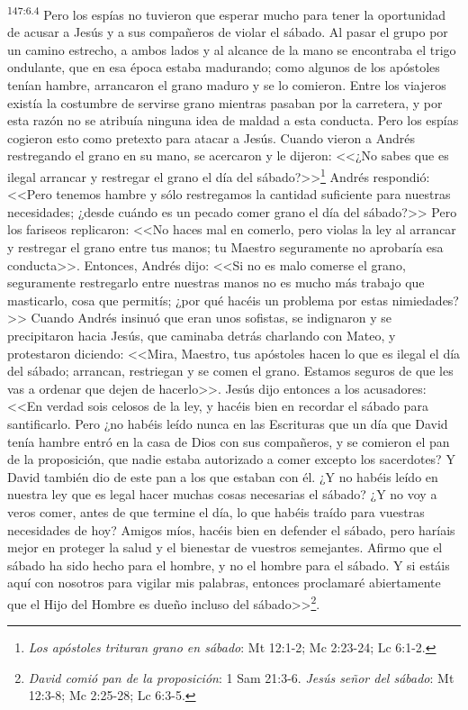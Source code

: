 \par 
\textsuperscript{147:6.4} Pero los espías no tuvieron que esperar mucho para tener la oportunidad de acusar a Jesús y a sus compañeros de violar el sábado. Al pasar el grupo por un camino estrecho, a ambos lados y al alcance de la mano se encontraba el trigo ondulante, que en esa época estaba madurando; como algunos de los apóstoles tenían hambre, arrancaron el grano maduro y se lo comieron. Entre los viajeros existía la costumbre de servirse grano mientras pasaban por la carretera, y por esta razón no se atribuía ninguna idea de maldad a esta conducta. Pero los espías cogieron esto como pretexto para atacar a Jesús. Cuando vieron a Andrés restregando el grano en su mano, se acercaron y le dijeron: <<¿No sabes que es ilegal arrancar y restregar el grano el día del sábado?>>\footnote{\textit{Los apóstoles trituran grano en sábado}: Mt 12:1-2; Mc 2:23-24; Lc 6:1-2.} Andrés respondió: <<Pero tenemos hambre y sólo restregamos la cantidad suficiente para nuestras necesidades; ¿desde cuándo es un pecado comer grano el día del sábado?>> Pero los fariseos replicaron: <<No haces mal en comerlo, pero violas la ley al arrancar y restregar el grano entre tus manos; tu Maestro seguramente no aprobaría esa conducta>>. Entonces, Andrés dijo: <<Si no es malo comerse el grano, seguramente restregarlo entre nuestras manos no es mucho más trabajo que masticarlo, cosa que permitís; ¿por qué hacéis un problema por estas nimiedades?>> Cuando Andrés insinuó que eran unos sofistas, se indignaron y se precipitaron hacia Jesús, que caminaba detrás charlando con Mateo, y protestaron diciendo: <<Mira, Maestro, tus apóstoles hacen lo que es ilegal el día del sábado; arrancan, restriegan y se comen el grano. Estamos seguros de que les vas a ordenar que dejen de hacerlo>>. Jesús dijo entonces a los acusadores: <<En verdad sois celosos de la ley, y hacéis bien en recordar el sábado para santificarlo. Pero ¿no habéis leído nunca en las Escrituras que un día que David tenía hambre entró en la casa de Dios con sus compañeros, y se comieron el pan de la proposición, que nadie estaba autorizado a comer excepto los sacerdotes? Y David también dio de este pan a los que estaban con él. ¿Y no habéis leído en nuestra ley que es legal hacer muchas cosas necesarias el sábado? ¿Y no voy a veros comer, antes de que termine el día, lo que habéis traído para vuestras necesidades de hoy? Amigos míos, hacéis bien en defender el sábado, pero haríais mejor en proteger la salud y el bienestar de vuestros semejantes. Afirmo que el sábado ha sido hecho para el hombre, y no el hombre para el sábado. Y si estáis aquí con nosotros para vigilar mis palabras, entonces proclamaré abiertamente que el Hijo del Hombre es dueño incluso del sábado>>\footnote{\textit{David comió pan de la proposición}: 1 Sam 21:3-6. \textit{Jesús señor del sábado}: Mt 12:3-8; Mc 2:25-28; Lc 6:3-5.}.

